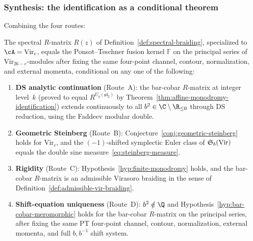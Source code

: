 \subsubsection{Synthesis: the identification as a conditional theorem}
\label{subsubsec:synthesis-PT}

Combining the four routes:

\begin{theorem}
\label{thm:R-equals-PT-conditional}
The spectral $R$-matrix $R(z)$ of
Definition~\textup{\ref{def:spectral-braiding}}, specialized to
$\cA = \mathrm{Vir}_c$, equals the Ponsot--Teschner fusion kernel
$\mathbb{F}$ on the principal series of
$\mathrm{Vir}_{26-c}$-modules after fixing the same four-point
channel, contour, normalization, and external momenta, conditional on
any one of the following:
\begin{enumerate}[label=\textup{(\Alph*)}]
\item \textbf{DS analytic continuation}
 (Route~A): the bar-cobar $R$-matrix at integer level~$k$
 (proved to equal $R^{U_q(\mathfrak{sl}_2)}$ by
 Theorem~\textup{\ref{thm:affine-monodromy-identification}})
 extends continuously to all $b^2 \in \C \setminus \R_{\le 0}$
 through DS reduction, using the Faddeev modular double.

\item \textbf{Geometric Steinberg}
 (Route~B): Conjecture~\textup{\ref{conj:geometric-steinberg}}
 holds for $\mathrm{Vir}_c$, and the $(-1)$-shifted symplectic
 Euler class of $\mathfrak{S}_b(\mathrm{Vir})$ equals the double
 sine measure~\eqref{eq:steinberg-measure}.

\item \textbf{Rigidity}
 (Route~C): Hypothesis~\textup{\ref{hyp:finite-monodromy}} holds,
 and the bar-cobar $R$-matrix is an admissible Virasoro braiding
 in the sense of
 Definition~\textup{\ref{def:admissible-vir-braiding}}.

\item \textbf{Shift-equation uniqueness}
 (Route~D): $b^2 \notin \Q$ and
 Hypothesis~\textup{\ref{hyp:bar-cobar-meromorphic}} holds for
 the bar-cobar $R$-matrix on the principal series, after fixing the
 same PT four-point channel, contour, normalization, external momenta,
 and full $b,b^{-1}$ shift system.
\end{enumerate}
\end{theorem}

